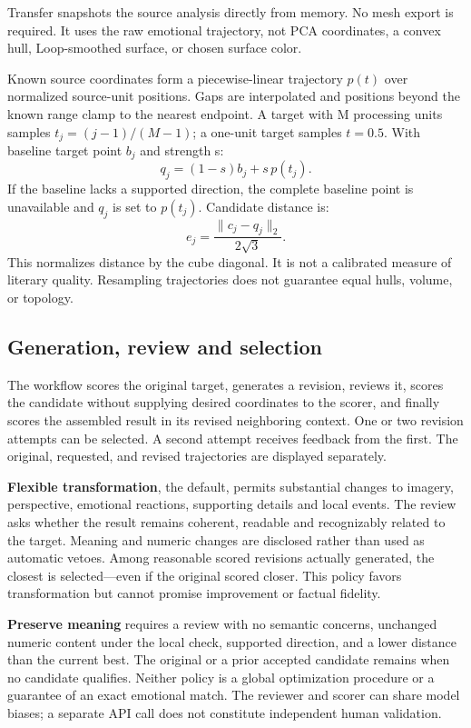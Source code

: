 \documentclass[manuscript,screen,nonacm]{acmart}
\begin{document}
Transfer snapshots the source analysis directly from memory. No mesh
export is required. It uses the raw emotional trajectory, not PCA
coordinates, a convex hull, Loop-smoothed surface, or chosen surface
color.

Known source coordinates form a piecewise-linear trajectory \(p(t)\)
over normalized source-unit positions. Gaps are interpolated and
positions beyond the known range clamp to the nearest endpoint. A target
with M processing units samples \(t_j=(j-1)/(M-1)\); a one-unit target
samples \(t=0.5\). With baseline target point \(b_j\) and strength s:
\[q_j=(1-s)b_j+s\,p(t_j).\]
If the baseline lacks a supported direction, the complete baseline point
is unavailable and \(q_j\) is set to \(p(t_j)\). Candidate distance is:
\[e_j=\frac{\lVert c_j-q_j\rVert_2}{2\sqrt{3}}.\]
This normalizes distance by the cube diagonal. It is not a calibrated
measure of literary quality. Resampling trajectories does not guarantee
equal hulls, volume, or topology.

\subsection{Generation, review and
selection}\label{generation-review-and-selection}

The workflow scores the original target, generates a revision, reviews
it, scores the candidate without supplying desired coordinates to the
scorer, and finally scores the assembled result in its revised
neighboring context. One or two revision attempts can be selected. A
second attempt receives feedback from the first. The original,
requested, and revised trajectories are displayed separately.

\textbf{Flexible transformation}, the default, permits substantial
changes to imagery, perspective, emotional reactions, supporting details
and local events. The review asks whether the result remains coherent,
readable and recognizably related to the target. Meaning and numeric
changes are disclosed rather than used as automatic vetoes. Among
reasonable scored revisions actually generated, the closest is
selected---even if the original scored closer. This policy favors
transformation but cannot promise improvement or factual fidelity.

\textbf{Preserve meaning} requires a review with no semantic concerns,
unchanged numeric content under the local check, supported direction,
and a lower distance than the current best. The original or a prior
accepted candidate remains when no candidate qualifies. Neither policy
is a global optimization procedure or a guarantee of an exact emotional
match. The reviewer and scorer can share model biases; a separate API
call does not constitute independent human validation.
\end{document}
